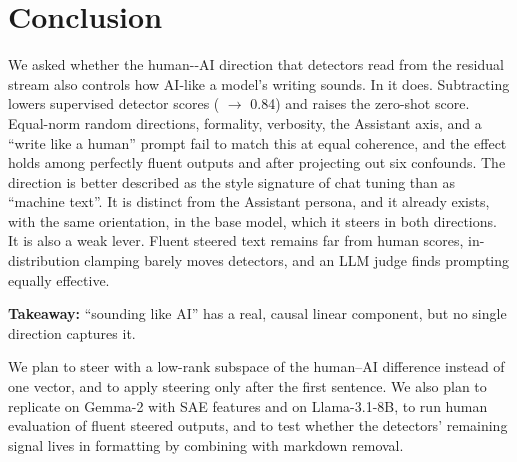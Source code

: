 \section{Conclusion}
\label{sec:conclusion}

We asked whether the human-\versus-AI direction that detectors read from the residual stream also controls how AI-like a model's writing sounds. In \qwen it does.
Subtracting \dai lowers supervised detector scores ( $\to$ 0.84) and raises the zero-shot \binoculars score. Equal-norm random directions, formality, verbosity, the Assistant axis, and a ``write like a human'' prompt fail to match this at equal coherence, and the effect holds among perfectly fluent outputs and after projecting out six confounds.
The direction is better described as the style signature of chat tuning than as ``machine text''. It is distinct from the Assistant persona, and it already exists, with the same orientation, in the base model, which it steers in both directions.
It is also a weak lever. Fluent steered text remains far from human scores, in-distribution clamping barely moves detectors, and an LLM judge finds prompting equally effective.

{\bf Takeaway:} ``sounding like AI'' has a real, causal linear component, but no single direction captures it.

 We plan to steer with a low-rank subspace of the human--AI difference instead of one vector, and to apply steering only after the first sentence. We also plan to replicate on Gemma-2 with SAE features and on Llama-3.1-8B, to run human evaluation of fluent steered outputs, and to test whether the detectors' remaining signal lives in formatting by combining \dai with markdown removal.
